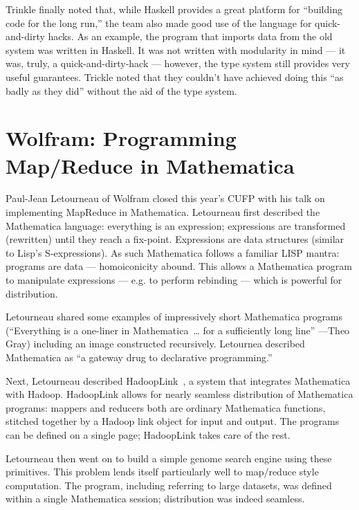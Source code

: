 \documentclass{jfp1}
\begin{document}
Trinkle finally noted that, while Haskell provides a great platform
for ``building code for the long run,'' the team also made good use of
the language for quick-and-dirty hacks. As an example, the program
that imports data from the old system was written in Haskell. It was
not written with modularity in mind --- it was, truly, a
quick-and-dirty-hack --- however, the type system still provides very
useful guarantees. Trickle noted that they couldn't have achieved
doing this ``as badly as they did'' without the aid of the type
system.

\section{Wolfram: Programming Map/Reduce in Mathematica}


Paul-Jean Letourneau of Wolfram closed this year's CUFP with his talk
on implementing MapReduce in Mathematica. Letourneau first described
the Mathematica language: everything is an expression; expressions are
transformed (rewritten) until they reach a fix-point. Expressions are
data structures (similar to Lisp's S-expressions).  As such Mathematica
follows a familiar LISP mantra: programs are data --- homoiconicity
abound. This allows a Mathematica program to manipulate expressions
--- e.g. to perform rebinding --- which is powerful for distribution.

Letourneau shared some examples of impressively short Mathematica
programs (``Everything is a one-liner in Mathematica~\ldots{} for a sufficiently
long line'' ---Theo Gray) including an image constructed recursively. 
Letournea described Mathematica as ``a gateway drug to declarative
programming.''

Next, Letourneau described
HadoopLink~\cite{Letourneau:2013:HadoopLink}, a system that integrates
Mathematica with Hadoop. HadoopLink allows for nearly seamless
distribution of Mathematica programs: mappers and reducers both are
ordinary Mathematica functions, stitched together by a Hadoop link
object for input and output. The programs can be defined on a single
page; HadoopLink takes care of the rest.

Letourneau then went on to build a simple genome search engine using
these primitives.  This problem lends itself particularly well to map/reduce
style computation. The program, including referring to large datasets,
was defined within a single Mathematica session; distribution was indeed
seamless.
\end{document}
